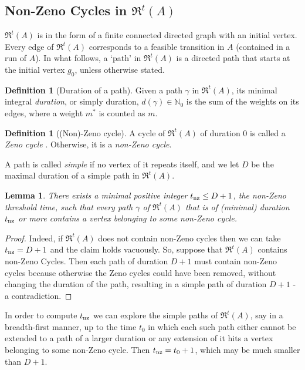 \documentclass[11pt]{amsart}
\newtheorem{lemma}[theorem]{Lemma}
\theoremstyle{definition}
\newtheorem{definition}[theorem]{Definition}
\newcommand{\ARRR}{\mathfrak{R}^t}
\newcommand{\ZNaturals}{\mathbb{N}_0}
\begin{document}
\subsection{Non-Zeno Cycles in $\ARRR(A)$}
$\ARRR(A)$ is in the form of a finite connected directed graph with an initial vertex.
Every edge of $\ARRR(A)$ corresponds to a feasible transition in $A$ (contained in a run of $A$).
In what follows, a `path' in $\ARRR(A)$ is a directed path that starts at the initial vertex $g_0$, unless otherwise stated.
\begin{definition}[Duration of a path]
Given a path $\gamma$ in $\ARRR(A)$, its minimal integral \emph{duration}, or simply duration, $d(\gamma) \in \ZNaturals$ is the sum of the weights on its edges, where a weight $m^*$ is counted as $m$.
\end{definition}
\begin{definition}[(Non)-Zeno cycle]
A  cycle of $\ARRR(A)$ of duration $0$ is called a \emph{Zeno cycle} .
Otherwise, it is a \emph{non-Zeno cycle}.
\end{definition}
A path is called \emph{simple} if no vertex of it repeats itself, and we let $D$ be the maximal duration of a simple path in $\ARRR(A)$.
\begin{lemma}
\label{lem:reg_time}
There exists a minimal positive integer $t_{\textnormal{nz}} \leq D+1$, the non-Zeno threshold time, such that every path $\gamma$ of $\ARRR(A)$ that is of (minimal) duration $t_{\textnormal{nz}}$ or more contains a vertex belonging to some non-Zeno cycle.
\end{lemma}
\begin{proof}
Indeed, if $\ARRR(A)$ does not contain non-Zeno cycles then we can take $t_{\textnormal{nz}} = D+1$ and the claim holds vacuously.
So, suppose that $\ARRR(A)$ contains non-Zeno Cycles.
Then each path of duration $D+1$ must contain non-Zeno cycles because otherwise the Zeno cycles could have been removed, without changing the duration of the path, resulting in a simple path of duration $D+1$ - a contradiction.
\end{proof}
In order to compute $t_{\textnormal{nz}}$ we can explore the simple paths of $\ARRR(A)$, say in a breadth-first manner, up to the time $t_0$ in which each such path either cannot be extended to a path of a larger duration or any extension of it hits a vertex belonging to some non-Zeno cycle.
Then $t_{\textnormal{nz}}=t_0 +1$, which may be much smaller than $D+1$.
\end{document}

